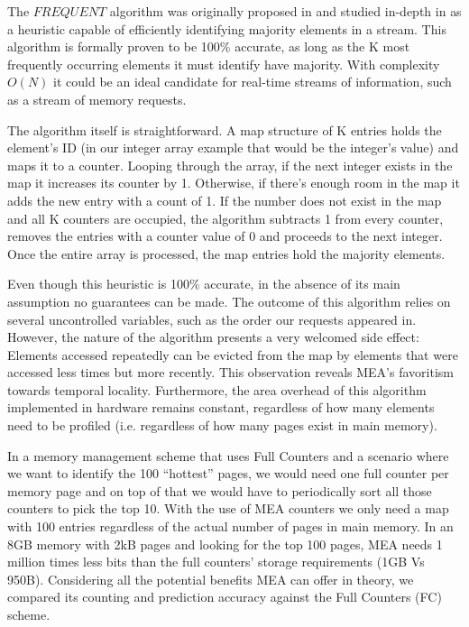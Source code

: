 The $FREQUENT$ algorithm was originally proposed in \cite{karp-mea} and studied in-depth in \cite{charikar-mae} as a heuristic capable of efficiently identifying majority elements in a stream. This algorithm is formally proven to be 100\% accurate, as long as the K most frequently occurring elements it must identify have majority. With complexity $O(N)$ it could be an ideal candidate for real-time streams of information, such as a stream of memory requests.

The algorithm itself is straightforward. A map structure of K entries holds the element's ID (in our integer array example that would be the integer's value) and maps it to a counter. Looping through the array, if the next integer exists in the map it increases its counter by 1. Otherwise, if there's enough room in the map it adds the new entry with a count of 1. If the number does not exist in the map and all K counters are occupied, the algorithm subtracts 1 from every counter, removes the entries with a counter value of 0 and proceeds to the next integer. Once the entire array is processed, the map entries hold the majority elements.

Even though this heuristic is 100\% accurate, in the absence of its main assumption no guarantees can be made. The outcome of this algorithm relies on several uncontrolled variables, such as the order our requests appeared in. However, the nature of the algorithm presents a very welcomed side effect: Elements accessed repeatedly can be evicted from the map by elements that were accessed less times but more recently. This observation reveals MEA's favoritism towards temporal locality. Furthermore, the area overhead of this algorithm implemented in hardware remains constant, regardless of how many elements need to be profiled (i.e. regardless of how many pages exist in main memory). 

In a memory management scheme that uses Full Counters and a scenario where we want to identify the 100 ``hottest'' pages, we would need one full counter per memory page and on top of that we would have to periodically sort all those counters to pick the top 10. With the use of MEA counters we only need a map with 100 entries regardless of the actual number of pages in main memory. In an 8GB memory with 2kB pages and looking for the top 100 pages, MEA needs 1 million times less bits than the full counters' storage requirements (1GB Vs 950B). Considering all the potential benefits MEA can offer in theory, we compared its counting and prediction accuracy against the Full Counters (FC) scheme. 


